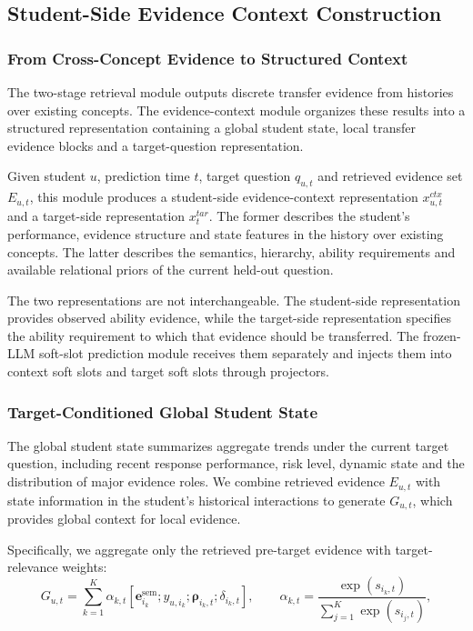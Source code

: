 \documentclass[a4paper,12pt]{article}
\numberwithin{table}{section}
\begin{document}
\subsection{Student-Side Evidence Context Construction}

\subsubsection{From Cross-Concept Evidence to Structured Context}

The two-stage retrieval module outputs discrete transfer evidence from histories over existing concepts. The evidence-context module organizes these results into a structured representation containing a global student state, local transfer evidence blocks and a target-question representation.

Given student \(u\), prediction time \(t\), target question \(q_{u,t}\) and retrieved evidence set \(E_{u,t}\), this module produces a student-side evidence-context representation \(x^{ctx}_{u,t}\) and a target-side representation \(x^{tar}_{t}\). The former describes the student's performance, evidence structure and state features in the history over existing concepts. The latter describes the semantics, hierarchy, ability requirements and available relational priors of the current held-out question.

The two representations are not interchangeable. The student-side representation provides observed ability evidence, while the target-side representation specifies the ability requirement to which that evidence should be transferred. The frozen-LLM soft-slot prediction module receives them separately and injects them into context soft slots and target soft slots through projectors.

\subsubsection{Target-Conditioned Global Student State}

The global student state summarizes aggregate trends under the current target question, including recent response performance, risk level, dynamic state and the distribution of major evidence roles. We combine retrieved evidence \(E_{u,t}\) with state information in the student's historical interactions to generate \(G_{u,t}\), which provides global context for local evidence.

Specifically, we aggregate only the retrieved pre-target evidence with target-relevance weights:
\[
{G_{u,t}=\sum_{k=1}^{K}\alpha_{k,t}\left[\mathbf e_{i_k}^{\mathrm{sem}};y_{u,i_k};\boldsymbol{\rho}_{i_k,t};\delta_{i_k,t}\right],\qquad \alpha_{k,t}=\frac{\exp(s_{i_k,t})}{\sum_{j=1}^{K}\exp(s_{i_j,t})},}
\]
\end{document}
